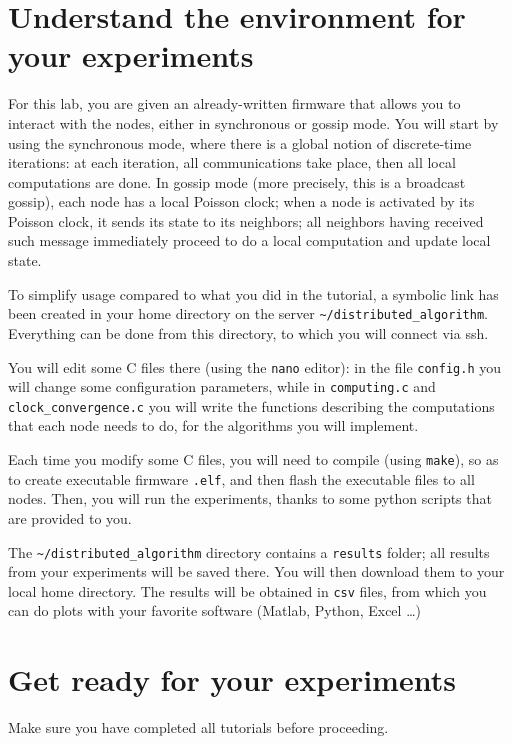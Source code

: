 \documentclass[oneside]{article}
\begin{document}
\section{Understand the environment for your experiments}

For this lab, you are given
an already-written firmware that allows you to interact with the nodes,
either in synchronous or gossip mode.
You will start by using the synchronous mode,
where there is a global notion of discrete-time iterations: at each iteration,
all communications take place, then all local computations are done.
In gossip mode (more precisely, this is a broadcast gossip), each node has a local Poisson clock; when a node is activated by its Poisson clock, it sends its state to its neighbors; all neighbors having received such message immediately proceed to do a local computation and update local state.



To simplify usage compared to what you did in the tutorial, a symbolic link has been
created in your home directory on the server \verb=~/distributed_algorithm=.
Everything can be done from this directory, to which you will connect via ssh.

You will edit some C files there (using the \verb=nano= editor): in the file \verb=config.h= you will change some configuration parameters, while in  \verb=computing.c= and \verb=clock_convergence.c= you will write the functions describing the computations that each node needs to do, for the algorithms you will implement.

Each time you modify some C files, you will need to compile (using \verb=make=), so as to create executable firmware \verb=.elf=, and then flash the executable files to all nodes. Then, you will run the experiments, thanks to some python scripts that are provided to you.

The \verb=~/distributed_algorithm= directory contains a \verb=results= folder; all results from your experiments will be saved there. You will then download them to your local home directory.
The results will be obtained in  \verb=csv= files, from which you can do plots with your favorite software (Matlab, Python, Excel \dots)


\newpage

\section{Get ready for your experiments}
Make sure you have completed all tutorials before proceeding.
\end{document}
